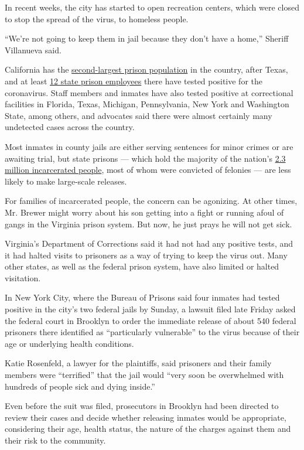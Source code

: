 In recent weeks, the city has started to open recreation centers, which
were closed to stop the spread of the virus, to homeless people.

``We're not going to keep them in jail because they don't have a home,''
Sheriff Villanueva said.

California has the
\href{https://www.bjs.gov/content/pub/pdf/p17.pdf}{second-largest prison
population} in the country, after Texas, and at least
\href{https://www.sacbee.com/news/politics-government/the-state-worker/article241531806.html}{12
state prison employees} there have tested positive for the coronavirus.
Staff members and inmates have also tested positive at correctional
facilities in Florida, Texas, Michigan, Pennsylvania, New York and
Washington State, among others, and advocates said there were almost
certainly many undetected cases across the country.

Most inmates in county jails are either serving sentences for minor
crimes or are awaiting trial, but state prisons --- which hold the
majority of the nation's
\href{https://www.prisonpolicy.org/reports/pie2020.html}{2.3 million
incarcerated people}, most of whom were convicted of felonies --- are
less likely to make large-scale releases.

For families of incarcerated people, the concern can be agonizing. At
other times, Mr. Brewer might worry about his son getting into a fight
or running afoul of gangs in the Virginia prison system. But now, he
just prays he will not get sick.

Virginia's Department of Corrections said it had not had any positive
tests, and it had halted visits to prisoners as a way of trying to keep
the virus out. Many other states, as well as the federal prison system,
have also limited or halted visitation.

In New York City, where the Bureau of Prisons said four inmates had
tested positive in the city's two federal jails by Sunday, a lawsuit
filed late Friday asked the federal court in Brooklyn to order the
immediate release of about 540 federal prisoners there identified as
``particularly vulnerable'' to the virus because of their age or
underlying health conditions.

Katie Rosenfeld, a lawyer for the plaintiffs, said prisoners and their
family members were ``terrified'' that the jail would ``very soon be
overwhelmed with hundreds of people sick and dying inside.''

Even before the suit was filed, prosecutors in Brooklyn had been
directed to review their cases and decide whether releasing inmates
would be appropriate, considering their age, health status, the nature
of the charges against them and their risk to the community.


